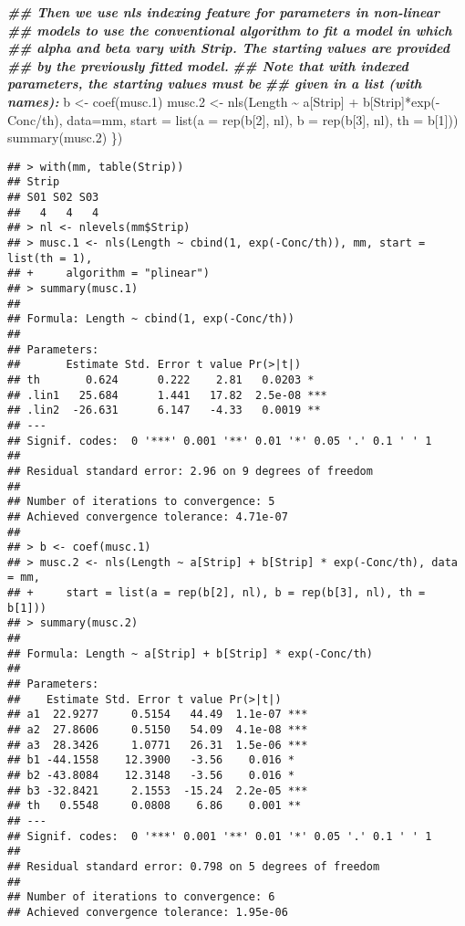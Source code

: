 \documentclass[
]{article}
\newenvironment{Shaded}{\begin{snugshade}}{\end{snugshade}}
\newcommand{\AttributeTok}[1]{\textcolor[rgb]{0.77,0.63,0.00}{#1}}
\newcommand{\DecValTok}[1]{\textcolor[rgb]{0.00,0.00,0.81}{#1}}
\newcommand{\DocumentationTok}[1]{\textcolor[rgb]{0.56,0.35,0.01}{\textbf{\textit{#1}}}}
\newcommand{\FloatTok}[1]{\textcolor[rgb]{0.00,0.00,0.81}{#1}}
\newcommand{\FunctionTok}[1]{\textcolor[rgb]{0.00,0.00,0.00}{#1}}
\newcommand{\NormalTok}[1]{#1}
\newcommand{\OtherTok}[1]{\textcolor[rgb]{0.56,0.35,0.01}{#1}}
\newcommand{\SpecialCharTok}[1]{\textcolor[rgb]{0.00,0.00,0.00}{#1}}
\begin{document}
\begin{Shaded}
\begin{Highlighting}[]
  \DocumentationTok{\#\# Then we use nls\textquotesingle{} indexing feature for parameters in non{-}linear}
  \DocumentationTok{\#\# models to use the conventional algorithm to fit a model in which}
  \DocumentationTok{\#\# alpha and beta vary with Strip.  The starting values are provided}
  \DocumentationTok{\#\# by the previously fitted model.}
  \DocumentationTok{\#\# Note that with indexed parameters, the starting values must be}
  \DocumentationTok{\#\# given in a list (with names):}
\NormalTok{  b }\OtherTok{\textless{}{-}} \FunctionTok{coef}\NormalTok{(musc}\FloatTok{.1}\NormalTok{)}
\NormalTok{  musc}\FloatTok{.2} \OtherTok{\textless{}{-}} \FunctionTok{nls}\NormalTok{(Length }\SpecialCharTok{\textasciitilde{}}\NormalTok{ a[Strip] }\SpecialCharTok{+}\NormalTok{ b[Strip]}\SpecialCharTok{*}\FunctionTok{exp}\NormalTok{(}\SpecialCharTok{{-}}\NormalTok{Conc}\SpecialCharTok{/}\NormalTok{th), }\AttributeTok{data=}\NormalTok{mm,}
                \AttributeTok{start =} \FunctionTok{list}\NormalTok{(}\AttributeTok{a =} \FunctionTok{rep}\NormalTok{(b[}\DecValTok{2}\NormalTok{], nl), }\AttributeTok{b =} \FunctionTok{rep}\NormalTok{(b[}\DecValTok{3}\NormalTok{], nl), }\AttributeTok{th =}\NormalTok{ b[}\DecValTok{1}\NormalTok{]))}
  \FunctionTok{summary}\NormalTok{(musc}\FloatTok{.2}\NormalTok{)}
\NormalTok{\})}
\end{Highlighting}
\end{Shaded}

\begin{verbatim}
## > with(mm, table(Strip))
## Strip
## S01 S02 S03 
##   4   4   4 
## > nl <- nlevels(mm$Strip)
## > musc.1 <- nls(Length ~ cbind(1, exp(-Conc/th)), mm, start = list(th = 1), 
## +     algorithm = "plinear")
## > summary(musc.1)
## 
## Formula: Length ~ cbind(1, exp(-Conc/th))
## 
## Parameters:
##       Estimate Std. Error t value Pr(>|t|)    
## th       0.624      0.222    2.81   0.0203 *  
## .lin1   25.684      1.441   17.82  2.5e-08 ***
## .lin2  -26.631      6.147   -4.33   0.0019 ** 
## ---
## Signif. codes:  0 '***' 0.001 '**' 0.01 '*' 0.05 '.' 0.1 ' ' 1
## 
## Residual standard error: 2.96 on 9 degrees of freedom
## 
## Number of iterations to convergence: 5 
## Achieved convergence tolerance: 4.71e-07
## 
## > b <- coef(musc.1)
## > musc.2 <- nls(Length ~ a[Strip] + b[Strip] * exp(-Conc/th), data = mm, 
## +     start = list(a = rep(b[2], nl), b = rep(b[3], nl), th = b[1]))
## > summary(musc.2)
## 
## Formula: Length ~ a[Strip] + b[Strip] * exp(-Conc/th)
## 
## Parameters:
##    Estimate Std. Error t value Pr(>|t|)    
## a1  22.9277     0.5154   44.49  1.1e-07 ***
## a2  27.8606     0.5150   54.09  4.1e-08 ***
## a3  28.3426     1.0771   26.31  1.5e-06 ***
## b1 -44.1558    12.3900   -3.56    0.016 *  
## b2 -43.8084    12.3148   -3.56    0.016 *  
## b3 -32.8421     2.1553  -15.24  2.2e-05 ***
## th   0.5548     0.0808    6.86    0.001 ** 
## ---
## Signif. codes:  0 '***' 0.001 '**' 0.01 '*' 0.05 '.' 0.1 ' ' 1
## 
## Residual standard error: 0.798 on 5 degrees of freedom
## 
## Number of iterations to convergence: 6 
## Achieved convergence tolerance: 1.95e-06
\end{verbatim}
\end{document}
